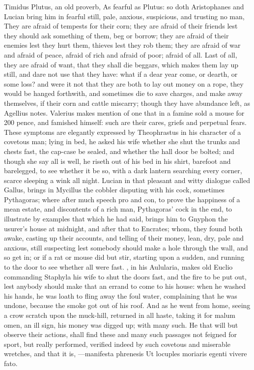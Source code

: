 {Timidus Plutus, an old proverb, As fearful as Plutus: so doth
Aristophanes and Lucian bring him in fearful still, pale, anxious,
suspicious, and trusting no man, They are afraid of tempests for
their corn; they are afraid of their friends lest they should ask
something of them, beg or borrow; they are afraid of their enemies lest
they hurt them, thieves lest they rob them; they are afraid of war and
afraid of peace, afraid of rich and afraid of poor; afraid of all. Last
of all, they are afraid of want, that they shall die beggars, which
makes them lay up still, and dare not use that they have: what if a
dear year come, or dearth, or some loss? and were it not that they are
both to lay out money on a rope, they would be hanged forthwith,
and sometimes die to save charges, and make away themselves, if their
corn and cattle miscarry; though they have abundance left, as
Agellius notes. Valerius makes mention of one that in a
famine sold a mouse for 200 pence, and famished himself: such are their
cares, griefs and perpetual fears. These symptoms are elegantly
expressed by Theophrastus in his character of a covetous man;
lying in bed, he asked his wife whether she shut the trunks and
chests fast, the cap-case be sealed, and whether the hall door be
bolted; and though she say all is well, he riseth out of his bed in his
shirt, barefoot and barelegged, to see whether it be so, with a dark
lantern searching every corner, scarce sleeping a wink all night.
Lucian in that pleasant and witty dialogue called Gallus, brings in
Mycillus the cobbler disputing with his cock, sometimes Pythagoras;
where after much speech pro and con, to prove the happiness of a mean
estate, and discontents of a rich man, Pythagoras' cock in the end, to
illustrate by examples that which he had said, brings him to Gnyphon
the usurer's house at midnight, and after that to Encrates; whom, they
found both awake, casting up their accounts, and telling of their
money, lean, dry, pale and anxious, still suspecting lest
somebody should make a hole through the wall, and so get in; or if a
rat or mouse did but stir, starting upon a sudden, and running to the
door to see whether all were fast. \Plautus{}, in his Aulularia, makes old
Euclio commanding Staphyla his wife to shut the doors fast, and
the fire to be put out, lest anybody should make that an errand to come
to his house: when he washed his hands, he was loath to fling
away the foul water, complaining that he was undone, because the smoke
got out of his roof. And as he went from home, seeing a crow scratch
upon the muck-hill, returned in all haste, taking it for malum omen, an
ill sign, his money was digged up; with many such. He that will but
observe their actions, shall find these and many such passages not
feigned for sport, but really performed, verified indeed by such
covetous and miserable wretches, and that it is,
---manifesta phrenesis
Ut locuples moriaris egenti vivere fato.

}
